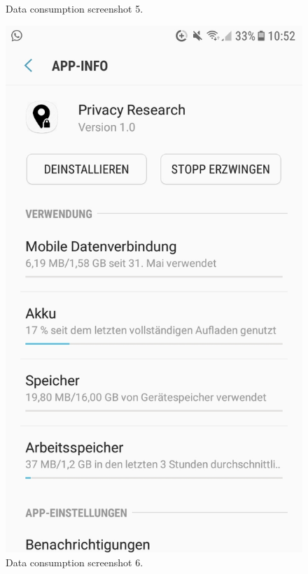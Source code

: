 \begin{figure}
\begin{minipage}{.45\textwidth}
\begin{center}
		\caption{Data consumption screenshot 5.}
		\end{center}
	\end{minipage}
	\hfill
	\begin{minipage}{.45\textwidth}
		\begin{center}
		\includegraphics[width=\textwidth]{data/data-usage/data-usage5.jpeg}
		\caption{Data consumption screenshot 6.}
		\end{center}
	\end{minipage}
\end{figure}

